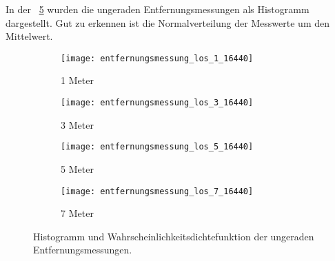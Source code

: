In der \figurename~\ref{fig:entfernungsmessung_los_16440} wurden die ungeraden Entfernungsmessungen als Histogramm dargestellt. Gut zu erkennen ist die Normalverteilung der Messwerte um den Mittelwert.

\begin{figure}[h!]
	\centering
	\begin{subfigure}[b]{0.45\textwidth}
		\centering
		\texttt{[image: entfernungsmessung\_los\_1\_16440]}
		\caption{1 Meter}
		\label{fig:entfernungsmessung_los_1_16440}
	\end{subfigure}
	\hfill
	\begin{subfigure}[b]{0.45\textwidth}
		\centering
		\texttt{[image: entfernungsmessung\_los\_3\_16440]}
		\caption{3 Meter}
		\label{fig:entfernungsmessung_los_3_16440}
	\end{subfigure}
	\bigskip
	\begin{subfigure}[b]{0.45\textwidth}
		\centering
		\texttt{[image: entfernungsmessung\_los\_5\_16440]}
		\caption{5 Meter}
		\label{fig:entfernungsmessung_los_5_16440}
	\end{subfigure}
	\hfil
	\begin{subfigure}[b]{0.45\textwidth}
		\centering
		\texttt{[image: entfernungsmessung\_los\_7\_16440]}
		\caption{7 Meter}
		\label{fig:entfernungsmessung_los_7_16440}
	\end{subfigure}
	\caption{Histogramm und Wahrscheinlichkeitsdichtefunktion der ungeraden Entfernungsmessungen.}
	\label{fig:entfernungsmessung_los_16440}
\end{figure}


\begin{comment}
--------------------------------------------------------------------------------
- Diagramme
	- \cite{kurth2003experimental}
		- Fig. 5: (1) The ground truth path with tags indicated by circles. The numbers indicate how many range measurements were received from each tag over the duration of Test 1. (2) The path estimate from dead reckoning alone. (3) The path estimate from localization using a Kalman Filter. The Filter fuses data from odometry and a gyro with absolute measurements from RF tags to produce this path estimate. Numerical results are given in Table 1. (X: position in x(m), Y: position in y(m), Ground truth path with tag locations, Dead reckoning path, Kalman filter localization path)

		
- Versuchsbeschreibung:
	- Warum wurden die uwbm da platziert wo sie jetzt stehen?
	
\end{comment}
